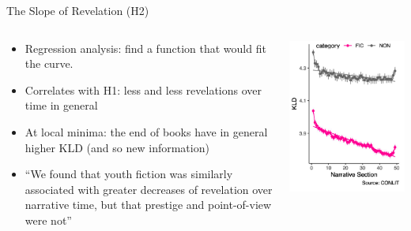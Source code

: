 \documentclass[aspectratio=169]{beamer}
\begin{document}
\begin{frame}{The Slope of Revelation (H2)}
    \begin{columns}
        \begin{column}{.7\textwidth}
            
            \begin{itemize}
                \item Regression analysis: find a function that would fit the curve.
                \item Correlates with H1: less and less revelations over time in general
                \item At local minima: the end of books have in general higher KLD (and so new information)
                \item ``We found that youth fiction was similarly associated with greater decreases of revelation over narrative time, but that prestige and point-of-view were not''
            \end{itemize}
        \end{column}
        \begin{column}{.3\textwidth}
            \includegraphics[width=\linewidth]{images/entropy_linear.png}
        \end{column}
    \end{columns}
\end{frame}
\end{document}
